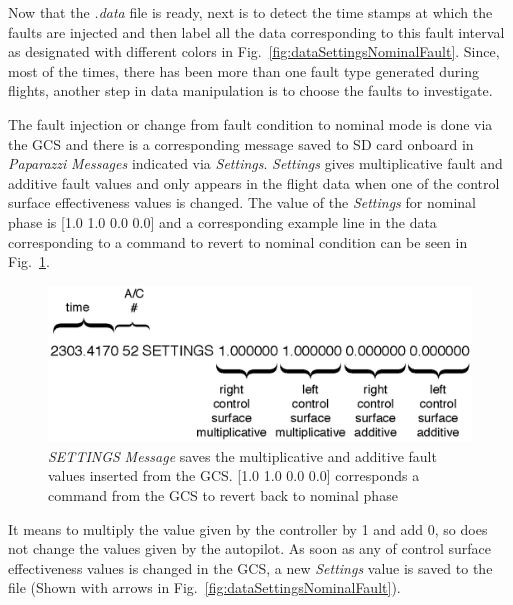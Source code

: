 Now that the \emph{.data} file is ready, next is to detect the time stamps at which the faults are injected and then label all the data corresponding to this fault interval as designated with different colors in Fig.~\ref{fig:dataSettingsNominalFault}. 
Since, most of the times, there has been more than one fault type generated during flights, another step in data manipulation is to choose the faults to investigate. 

The fault injection or change from fault condition to nominal mode is done via the GCS and there is a corresponding message saved to SD card onboard in \emph{Paparazzi} \emph{Messages} indicated via \emph{Settings}. 
\emph{Settings} gives multiplicative fault and additive fault values and only appears in the flight data when one of the control surface effectiveness values is changed. 
The value of the \emph{Settings} for nominal phase is [1.0 1.0 0.0 0.0] and a corresponding example line in the data corresponding to a command to revert to nominal condition can be seen in Fig.~\ref{fig:flightDataSettings}. 

\begin{figure}[h]
\begin{center}
\includegraphics[width=13cm]{figures/flightDataSettings}    %
\caption{\emph{SETTINGS} \emph{Message} saves the multiplicative and additive fault values inserted from the GCS.  [1.0 1.0 0.0 0.0] corresponds a command from the GCS to revert back to nominal phase} 
\label{fig:flightDataSettings}
\end{center}
\end{figure}

It means to multiply the value given by the controller by 1 and add 0, so does not change the values given by the autopilot. 
As soon as any of control surface effectiveness values is changed in the GCS, a new \emph{Settings} value is saved to the file (Shown with arrows in Fig.~\ref{fig:dataSettingsNominalFault}). 

